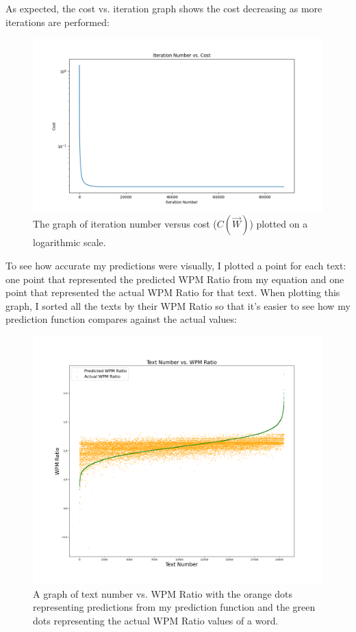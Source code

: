 \documentclass[12pt]{article}
\begin{document}
As expected, the cost vs. iteration graph shows the cost decreasing as more iterations are performed:
\begin{figure}[H]
	\caption{The graph of iteration number versus cost ($C(\vec{W})$) plotted on a logarithmic scale.}
	\includegraphics[width=1\textwidth]{cost.png}
\end{figure}

To see how accurate my predictions were visually, I plotted a point for each text: one point that represented the predicted WPM Ratio from my equation and one point that represented the actual WPM Ratio for that text. When plotting this graph, I sorted all the texts by their WPM Ratio so that it's easier to see how my prediction function compares against the actual values:

\begin{figure}[H]
	\caption{A graph of text number vs. WPM Ratio with the orange dots representing predictions from my prediction function and the green dots representing the actual WPM Ratio values of a word.}
	\includegraphics[width=\textwidth]{predictions.png}
\end{figure}
\end{document}

